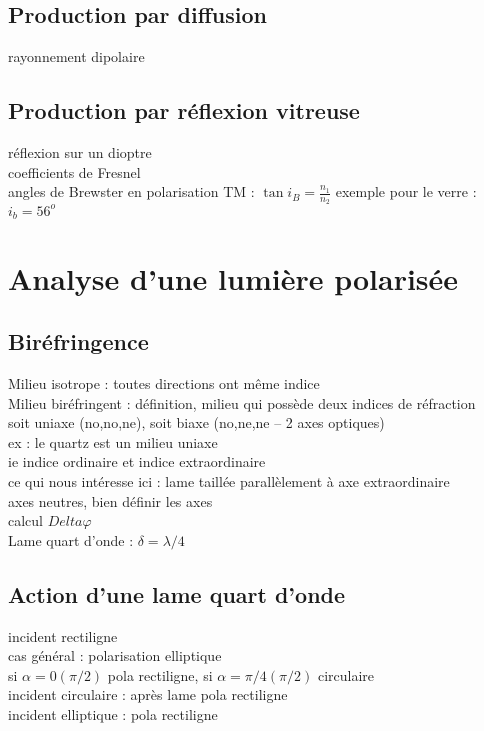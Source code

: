 \subsection{Production par diffusion}
rayonnement dipolaire \\

\subsection{Production par réflexion vitreuse}
réflexion sur un dioptre \\
coefficients de Fresnel \\
angles de Brewster en polarisation TM : $\tan i_B = \frac{n_1}{n_2}$ 
exemple pour le verre : $i_b=56^o$ \\



\section{Analyse d'une lumière polarisée}


\subsection{Biréfringence}
Milieu isotrope : toutes directions ont même indice \\
Milieu biréfringent : définition, milieu qui possède deux indices de réfraction \\
soit uniaxe (no,no,ne), soit biaxe (no,ne,ne -- 2 axes optiques) \\
ex : le quartz est un milieu uniaxe \\
ie indice ordinaire et indice extraordinaire \\
ce qui nous intéresse ici : lame taillée parallèlement à axe extraordinaire \\
axes neutres, bien définir les axes \\
calcul $Delta\varphi$ \\
Lame quart d'onde : $\delta=\lambda/4$

\subsection{Action d'une lame quart d'onde}
incident rectiligne \\
cas général : polarisation elliptique \\
si $\alpha=0(\pi/2)$ pola rectiligne, si $\alpha=\pi/4(\pi/2)$ circulaire \\
incident circulaire : après lame pola rectiligne \\
incident elliptique : pola rectiligne

